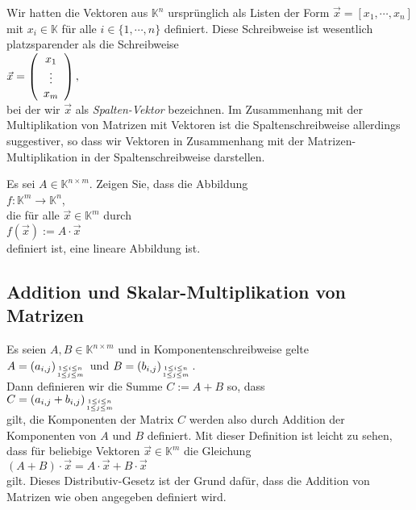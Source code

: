 \remark
Wir hatten die Vektoren aus $\mathbb{K}^n$ urspr\"{u}nglich als Listen der Form $\vec{x} = [x_1, \cdots, x_n]$ mit
$x_i \in \mathbb{K}$ f\"{u}r alle $i\in\{1,\cdots,n\}$ definiert.  Diese Schreibweise ist wesentlich
platzsparender als die Schreibweise
\\[0.2cm]
\hspace*{1.3cm}
$\vec{x} = \left(
      \begin{array}[c]{c}
      x_{1}  \\
      \vdots \\
      x_{m}  \\
      \end{array}
      \right),
$
\\[0.2cm]
bei der wir $\vec{x}$ als {\emph{\color{blue}Spalten-Vektor}} bezeichnen.  Im Zusammenhang mit der
Multiplikation von Matrizen mit Vektoren ist die Spaltenschreibweise allerdings 
suggestiver, so dass wir Vektoren in Zusammenhang mit der Matrizen-Multiplikation in der
Spaltenschreibweise darstellen.
\eoxs 
\pagebreak

\exercise
Es sei $A \in \mathbb{K}^{n \times m}$.  Zeigen Sie, dass die Abbildung
\\[0.2cm]
\hspace*{1.3cm}
$f: \mathbb{K} ^m \rightarrow \mathbb{K}^n$,
\\[0.2cm]
die f\"{u}r alle $\vec{x} \in \mathbb{K}^m$ durch
\\[0.2cm]
\hspace*{1.3cm}
$f(\vec{x}) := A \cdot \vec{x}$
\\[0.2cm]
definiert ist, eine lineare Abbildung ist.
\exend


\subsection{Addition und Skalar-Multiplikation von Matrizen}
Es seien $A,B \in \mathbb{K}^{n \times m}$ und in Komponentenschreibweise gelte 
\\[0.2cm]
\hspace*{1.3cm}
$A = (a_{i,j})_{1\leq i \leq n \atop 1 \leq j \leq m}$ \quad und \quad
$B = (b_{i,j})_{1\leq i \leq n \atop 1 \leq j \leq m}$.  
\\[0.2cm]
Dann definieren wir die Summe $C := A + B$ so, dass
\\[0.2cm]
\hspace*{1.3cm}
 $C = (a_{i,j} + b_{i,j})_{1\leq i \leq n \atop 1 \leq j \leq m}$ 
\\[0.2cm]
gilt, die Komponenten der
Matrix $C$ werden also durch Addition der Komponenten von $A$ und $B$  definiert.  Mit dieser
Definition ist leicht zu sehen, dass f\"{u}r beliebige Vektoren $\vec{x} \in \mathbb{K}^m$ die Gleichung
\\[0.2cm]
\hspace*{1.3cm}
$(A + B) \cdot \vec{x} = A \cdot \vec{x} + B \cdot \vec{x}$
\\[0.2cm]
gilt.  Dieses Distributiv-Gesetz ist der Grund daf\"{u}r, dass die Addition von Matrizen wie oben
angegeben definiert wird.


